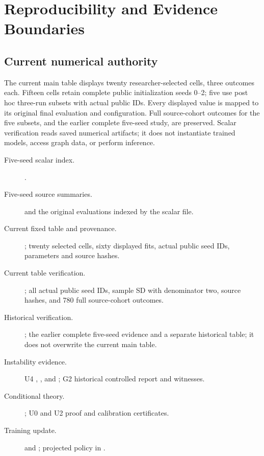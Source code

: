 \chapter{Reproducibility and Evidence Boundaries}\label{app:evidence}
\section{Current numerical authority}
The current main table displays twenty researcher-selected cells, three outcomes each. Fifteen cells retain complete public initialization seeds 0--2; five use post hoc three-run subsets with actual public IDs. Every displayed value is mapped to its original final evaluation and configuration. Full source-cohort outcomes for the five subsets, and the earlier complete five-seed study, are preserved. Scalar verification reads saved numerical artifacts; it does not instantiate trained models, access graph data, or perform inference.

\begingroup\small\raggedright
\begin{description}
\item[Five-seed scalar index.] .
\item[Five-seed source summaries.]  and the original evaluations indexed by the scalar file.
\item[Current fixed table and provenance.] ; twenty selected cells, sixty displayed fits, actual public seed IDs, parameters and source hashes.
\item[Current table verification.] ; all actual public seed IDs, sample SD with denominator two, source hashes, and 780 full source-cohort outcomes.
\item[Historical verification.] ; the earlier complete five-seed evidence and a separate historical table; it does not overwrite the current main table.
\item[Instability evidence.] U4 , , and ; G2 historical controlled report and witnesses.
\item[Conditional theory.] ; U0 and U2 proof and calibration certificates.
\item[Training update.]  and ; projected policy in .
\end{description}
\endgroup

